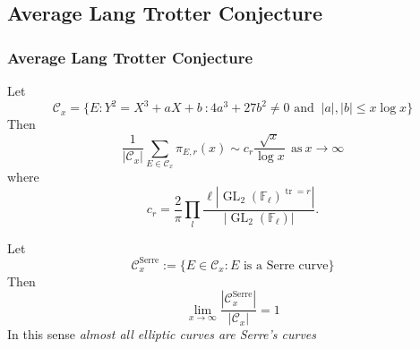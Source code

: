 \documentclass[10pt,handout]{beamer} %
\newcommand{\F}{\mathbb F}
\theoremstyle{definition}
\begin{document}
\subsection{Average Lang Trotter Conjecture}

\begin{frame}
\frametitle{Average Lang Trotter Conjecture}\pause

\begin{theorem}[David, F. P. (1997)]\pause
Let
$${\mathcal C}_{x}=\{E: Y^2=X^3+aX+b\ :4a^3+27b^2\ne0\text{ and }\ |a|,|b|\leq x\log x\}$$\pause
Then\vspace*{-5pt}
$$\frac{1}{|\mathcal C_x|}\sum_{E\in\mathcal C_x}\pi_{E,r}(x)\sim
c_r\frac{\sqrt{x}}{\log x}\ \ \textrm{as}\ x\rightarrow\infty
$$\pause
where
$$
c_r 
=\frac{2}{\pi}\prod_{l}
\frac{\ell|\operatorname{GL}_2(\F_\ell)^{\operatorname{tr}=r}|}{|\operatorname{GL}_2(\F_\ell)|}.
$$
\end{theorem}\pause

\begin{theorem}[N. Jones (2004)]
Let \vspace*{-5pt}$$\mathcal C_x^{\text{Serre}}:=\{E\in \mathcal{C}_x: E\text{ is a Serre curve}\}$$\pause
Then\vspace*{-5pt}
$$\lim_{x\rightarrow\infty}\frac{|\mathcal C_x^{\text{Serre}}|}{|\mathcal C_x|}=1$$\pause
In this sense \emph{almost all elliptic curves are Serre's curves}
\end{theorem}
\end{frame}
\end{document}
